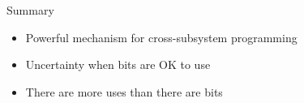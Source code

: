 \documentclass[black,white,aspectratio=169]{beamer}
\DeclareRobustCommand{\#}{\adjustbox{valign=B,totalheight=.57\baselineskip}{\oldhash}}%
\begin{document}

    \begin{frame}{Summary}
        \begin{itemize}
            \item Powerful mechanism for cross-subsystem programming~\medskip
            \item Uncertainty when bits are OK to use~\medskip
            \item There are more uses than there are bits~\medskip
        \end{itemize}
    \end{frame}
\end{document}

